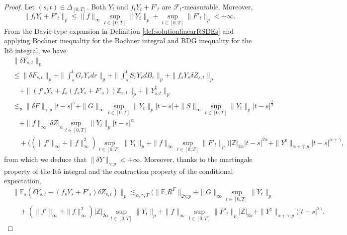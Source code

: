 \documentclass[11pt,a4paper]{article}
\newcommand{\E}{\mathbb{E}}
\theoremstyle{plain}
\begin{document}
\begin{proof}
    Let $(s,t)  \in \Delta_{[0,T]}$. Both $Y_t$ and $f_tY_t+F'_t$ are $\mathcal{F}_t$-measurable. Moreover,
    \begin{equation*} 
    \|f_tY_t+F'_t\|_p \le \|f\|_\infty \sup_{t\in [0,T]}\|Y_t\|_p + \sup_{t \in [0,T]}\|F'_t\|_p<+\infty.
\end{equation*} 
From the Davie-type expansion in Definition \ref{def:solutionlinearRSDEs} and applying Bochner inequality for the Bochner integral and BDG inequality for the It\^o integral, we have \begin{equation} \label{eq:solutionlinearRSDEsfirstholderestimate} \begin{aligned}
    &\|\delta Y_{s,t}\|_p \\
    &\le \|\delta F_{s,t}\|_p + \|\int_s^t G_rY_r dr\|_p + \|\int_s^t S_rY_rdB_r\|_p + \|f_sY_s\delta Z_{s,t}\|_p \\ & \quad    + \|(f'_sY_s+f_s(f_sY_s+F'_s))\mathbb{Z}_{s,t}\|_p +  \|Y^\natural_{s,t}\|_p 
    \\    
    &\lesssim_p \|\delta F\|_{\gamma;p}|t-s|^\gamma + \|G\|_\infty \sup_{t \in [0,T]} \|Y_t\|_p |t-s| + \|S\|_\infty \sup_{t \in [0,T]} \|Y_t\|_p |t-s|^\frac{1}{2}  \\
    & \quad + \|f\|_\infty |\delta Z|_\alpha \sup_{t \in [0,T]} \|Y_t\|_p |t-s|^\alpha  \\
    & \quad +  \big( (\|f'\|_\infty+\|f\|^2_\infty)  \sup_{t \in [0,T]} \|Y_t\|_p  +  \|f\|_\infty \sup_{t \in [0,T]} \|F'_t\|_p \big) |\mathbb{Z}|_{2\alpha} |t-s|^{2\alpha} +  \|Y^\natural\|_{\alpha+\gamma;p} |t-s|^{\alpha + \gamma},
\end{aligned} 
\end{equation} 
from which we deduce that $\|\delta Y\|_{\gamma;p} <+\infty$. Moreover, thanks to the martingale property of the It\^o integral and the contraction property of the conditional expectation, 
\begin{equation} \label{eq:remainderofthesolution_linearRSDEs}
    \begin{aligned}
        &\|\E_s(\delta Y_{s,t} - (f_sY_s+F'_s) \delta Z_{s,t})\|_p 
        \lesssim_{\alpha,\gamma,T} \Big( \|\E_\cdot R^F\|_{2\gamma;p} + \|G\|_\infty \sup_{t \in [0,T]} \|Y_t\|_p   \\ &\quad +(\|f'\|_\infty+\|f\|^2_\infty)|\mathbb{Z}|_{2\alpha} \sup_{t \in [0,T]} \|Y_t\|_p + \|f\|_\infty \sup_{t \in [0,T]} \|F'_t\|_p |\mathbb{Z}|_{2\alpha} + \| Y^\natural\|_{\alpha + \gamma;p} \Big) |t-s|^{2\gamma}.

\end{aligned}
\end{equation}
\end{proof}
\end{document}
